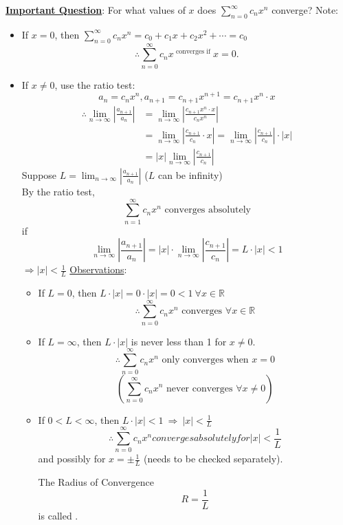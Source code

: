 \documentclass[12pt,a4paper]{article}
\def\R{{\mathbb{R}}}
\begin{document}
\begin{thm}{\underline{\textbf{Important Question}}: For what values of $x$ does $\displaystyle\sum_{n=0}^\infty c_n x^n$ converge?}
Note: 
\begin{itemize}
	\item If $x=0$, then $\displaystyle\sum_{n=0}^\infty c_n x^n=c_0+c_1x+c_2x^2+\cdots =c_0$
	$$\therefore\sum_{n=0}^\infty c_n x^\text{ converges if }x=0.$$
	\item If $x\neq0$, use the ratio test: 
	$$a_n=c_n x^n, a_{n+1}=c_{n+1}x^{n+1}=c_{n+1}x^n\cdot x$$
	$$\begin{aligned}
		\therefore\lim_{n\to\infty}\left|\frac{a_{n+1}}{a_n}\right|&=\lim_{n\to\infty}\left|\frac{c_{n+1}x^n\cdot x}{c_n x^n}\right|\\
		&=\lim_{n\to\infty}\left|\frac{c_{n+1}}{c_n}\cdot x\right|=\lim_{n\to\infty}\left|\frac{c_{n+1}}{c_{n}}\right|\cdot|x|\\
		&=|x|\lim_{n\to\infty}\left|\frac{c_{n+1}}{c_n}\right|
	\end{aligned}$$
	Suppose $\displaystyle L=\lim_{n\to\infty}\left|\frac{a_{n+1}}{a_n}\right|$ ($L$ can be infinity)\\
	By the ratio test, 
	$$\sum_{n=1}^\infty c_n x^n\text{ converges absolutely}$$
	if $$\lim_{n\to\infty}\left|\frac{a_{n+1}}{a_n}\right|=|x|\cdot\lim_{n\to\infty}\left|\frac{c_{n+1}}{c_n}\right|=L\cdot|x|<1$$
	$\displaystyle\Rightarrow |x|<\frac{1}{L}$
	\underline{Observations}:
	\begin{itemize}
		\item If $L=0$, then $L\cdot|x|=0\cdot|x|=0<1\ \forall x\in\R$
		$$\therefore\sum_{n=0}^\infty c_n x^n\text{ converges }\forall x\in\R$$
		\item If $\displaystyle L=\infty$, then $L\cdot|x|$ is never less than 1 for $x\neq0$.
		$$\therefore\sum_{n=0}^\infty c_n x^n\text{ only converges when }x=0$$
		$$\left(\sum_{n=0}^\infty c_n x^n\text{ never converges }\forall x\neq0\right)$$
		\item If $\displaystyle 0<L<\infty$, then $L\cdot|x|<1\ \Rightarrow\ |x|<\frac{1}{L}$
		$$\therefore\sum_{n=0}^\infty c_n x^n{ converges absolutely for} |x|<\frac{1}{L}$$ and possibly for $\displaystyle x=\pm\frac{1}{L}$ (needs to be checked separately).
		\begin{df}{The Radius of Convergence}
			$$R=\frac{1}{L}$$ is called {}.
		\end{df}
	\end{itemize}
\end{itemize}
\end{thm}
\end{document}
